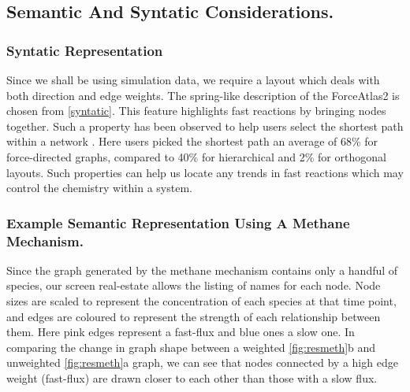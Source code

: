 \subsection{Semantic And Syntatic Considerations.}

\subsubsection{Syntatic Representation} 
Since we shall be using simulation data, we require a layout which deals with both direction and edge weights. The spring-like description of the  ForceAtlas2 is chosen from \autoref{syntatic}. This feature highlights fast reactions by bringing nodes together. Such a property has been observed to help users select the shortest path within a network \citep{eyetrack}. Here users picked the shortest path an average of 68\% for force-directed graphs, compared to 40\% for hierarchical and 2\% for orthogonal layouts. Such properties can help us locate any trends in fast reactions which may control the chemistry within a system. 


\subsubsection{Example Semantic Representation Using A Methane Mechanism.}
Since the graph generated by the methane mechanism contains only a handful of species, our screen real-estate allows the listing of names for each node. Node sizes are scaled to represent the concentration of each species at that time point, and edges are coloured to represent the strength of each relationship between them. Here pink edges represent a fast-flux and blue ones a slow one. In comparing the change in graph shape between a weighted \autoref{fig:resmeth}b and unweighted \autoref{fig:resmeth}a graph, we can see that nodes connected by a high edge weight (fast-flux) are drawn closer to each other than those with a slow flux.


